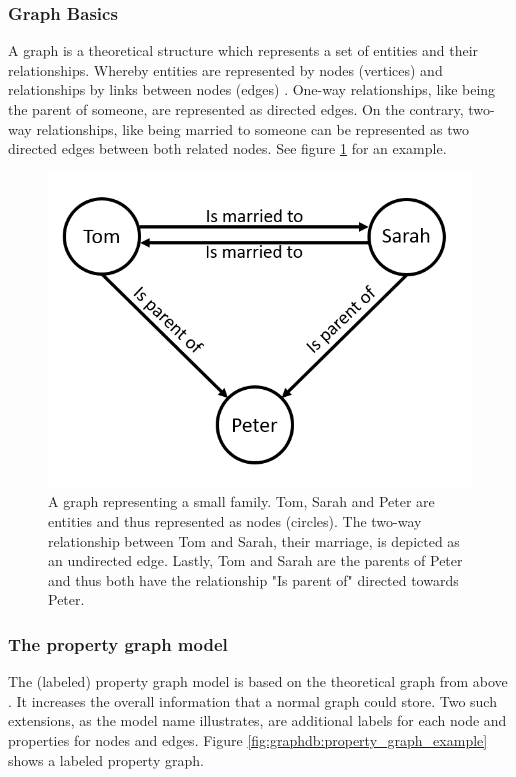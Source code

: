 \subsubsection{Graph Basics}
A graph is a theoretical structure which represents a set of entities and their relationships. Whereby entities are represented by nodes (vertices) and relationships by links between nodes (edges) \autocite{maheshlal2015, graphdb2015}. One-way relationships, like being the parent of someone, are represented as directed edges. On the contrary, two-way relationships, like being married to someone can be represented as two directed edges between both related nodes. See figure \ref{fig:graphdb:graph_example} for an example.

\begin{figure}[ht]
    \centering
    \includegraphics[width=.5\textwidth]{img/graph_example.PNG}
    \caption{A graph representing a small family. Tom, Sarah and Peter are entities and thus represented as nodes (circles). The two-way relationship between Tom and Sarah, their marriage, is depicted as an undirected edge. Lastly, Tom and Sarah are the parents of Peter and thus both have the relationship "Is parent of" directed towards Peter.}
    \label{fig:graphdb:graph_example}
\end{figure}

\subsubsection{The property graph model}
The (labeled) property graph model is based on the theoretical graph from above \autocite{maheshlal2015}. It increases the overall information that a normal graph could store. Two such extensions, as the model name illustrates, are additional labels for each node and properties for nodes and edges. Figure \ref{fig:graphdb:property_graph_example} shows a labeled property graph.

